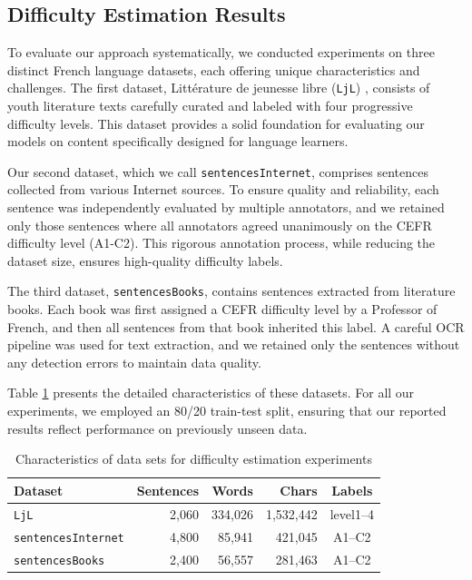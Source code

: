 \subsection{Difficulty Estimation Results}\label{sec:difficulty_estimation_results}

To evaluate our approach systematically, we conducted experiments on three distinct French language datasets, each offering unique characteristics and challenges. The first dataset, Littérature de jeunesse libre (\texttt{LjL}) \cite{opencorporaFrench2022}, consists of youth literature texts carefully curated and labeled with four progressive difficulty levels. This dataset provides a solid foundation for evaluating our models on content specifically designed for language learners.

Our second dataset, which we call \texttt{sentencesInternet}, comprises sentences collected from various Internet sources. To ensure quality and reliability, each sentence was independently evaluated by multiple annotators, and we retained only those sentences where all annotators agreed unanimously on the CEFR difficulty level (A1-C2). This rigorous annotation process, while reducing the dataset size, ensures high-quality difficulty labels.

The third dataset, \texttt{sentencesBooks}, contains sentences extracted from literature books. Each book was first assigned a CEFR difficulty level by a Professor of French, and then all sentences from that book inherited this label. A careful OCR pipeline was used for text extraction, and we retained only the sentences without any detection errors to maintain data quality.

Table \ref{tab:3-datasets} presents the detailed characteristics of these datasets. For all our experiments, we employed an 80/20 train-test split, ensuring that our reported results reflect performance on previously unseen data.

\begin{table}[htbp]
    \centering
    \caption{Characteristics of data sets for difficulty estimation experiments}
    \label{tab:3-datasets}
    \begin{tabular}{|l|r|r|r|c|}
        \hline
        \textbf{Dataset}                          & \textbf{Sentences} & \textbf{Words} & \textbf{Chars} & \textbf{Labels} \\
        \hline
        \texttt{LjL} \cite{opencorporaFrench2022} & 2,060              & 334,026        & 1,532,442      & level1--4       \\
        \texttt{sentencesInternet}                & 4,800              & 85,941         & 421,045        & A1--C2          \\
        \texttt{sentencesBooks}                   & 2,400              & 56,557         & 281,463        & A1--C2          \\
        \hline
    \end{tabular}
\end{table}

